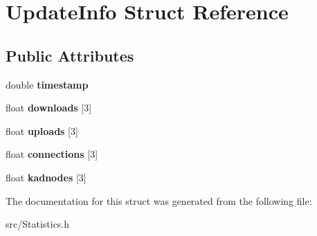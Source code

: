 \section{UpdateInfo Struct Reference}
\label{structUpdateInfo}
\subsection*{Public Attributes}
\begin{DoxyCompactItemize}
\item 
double {\bfseries timestamp}\label{structUpdateInfo_a843d98fbc6edf43ca9977492226e0d87}

\item 
float {\bfseries downloads} [3]\label{structUpdateInfo_af4f673759735c874f1c7018e260f2d2f}

\item 
float {\bfseries uploads} [3]\label{structUpdateInfo_ab729dd6d1ade5ebe7dbe58c6b4e2c9dd}

\item 
float {\bfseries connections} [3]\label{structUpdateInfo_aa5c6e123af2d31d6524210ca8a4b9157}

\item 
float {\bfseries kadnodes} [3]\label{structUpdateInfo_a5ca9aee973f50cdaa76d80f6fa2149a8}

\end{DoxyCompactItemize}


The documentation for this struct was generated from the following file:\begin{DoxyCompactItemize}
\item 
src/Statistics.h\end{DoxyCompactItemize}
